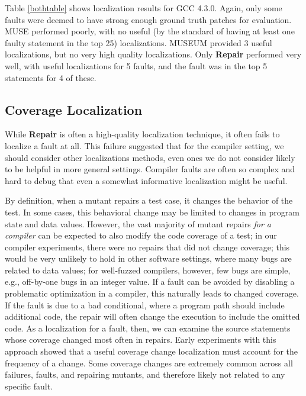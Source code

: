 Table \ref{bothtable} shows localization results for GCC 4.3.0.  Again, only some faults were deemed to have strong enough ground truth patches for evaluation.   MUSE performed poorly, with no useful (by the standard of having at least one faulty statement in the top 25) localizations.  MUSEUM provided 3 useful localizations, but no very high quality localizations.  Only {\bf Repair} performed very well, with useful localizations for 5 faults, and the fault was in the top 5 statements for 4 of these.

\subsection{Coverage Localization}
\label{sec:covloc}

While {\bf Repair} is often a high-quality localization technique, it often fails to localize a fault at all.  This failure suggested that for the compiler setting, we should consider other localizations methods, even ones we do not consider likely to be helpful in more general settings.  Compiler faults are often so complex and hard to debug that even a somewhat informative localization might be useful.

By definition, when a mutant repairs a test case, it changes the
behavior of the test.  In some cases, this behavioral change may be
limited to changes in program state and data values.  However, the
vast majority of mutant repairs \emph{for a compiler} can be expected to also modify the code coverage of a
test; in our compiler experiments, there were no repairs that did not change
coverage; this would be very unlikely to hold in other software settings, where many bugs are related to data values; for well-fuzzed compilers, however, few bugs are simple, e.g., off-by-one bugs in an integer value.  If a fault can be avoided by disabling a
problematic optimization in a compiler, this naturally leads to
changed coverage.  If the fault is due to a bad conditional, where a
program path should include additional code, the repair will often
change the execution to include the omitted code.  As a localization
for a fault, then, we can examine the source statements whose
coverage changed most often in repairs.  Early experiments with this
 approach showed that a useful coverage change localization must  account for the frequency of a
change.  Some coverage changes are extremely common across all
failures, faults, and repairing mutants,
and therefore likely not related to any specific fault.

